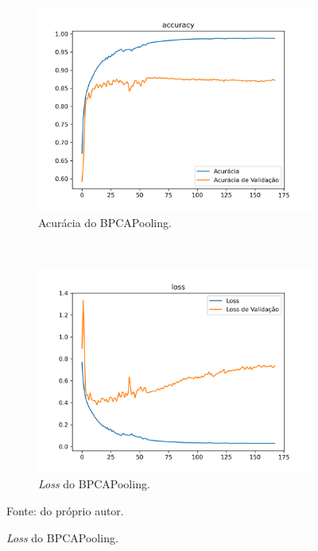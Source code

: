 \begin{figure}[H]
     \begin{subfigure}[t]{0.45\textwidth}
         \centering
         \includegraphics[width=1\linewidth]{recursos/imagens/results/bpca500_acc_accuracy.png}
         \caption{Acurácia do BPCAPooling.}
         \label{results:fig:semantic:metrics1.3}
     \end{subfigure}
     ~
     \begin{subfigure}[t]{0.45\textwidth}
         \centering
         \includegraphics[width=1\linewidth]{recursos/imagens/results/bpca500_acc_loss.png}
         \caption{\textit{Loss} do BPCAPooling.}
         \label{results:fig:semantic:metrics1.4}
     \end{subfigure}
     
     Fonte: do próprio autor.
\end{figure}

